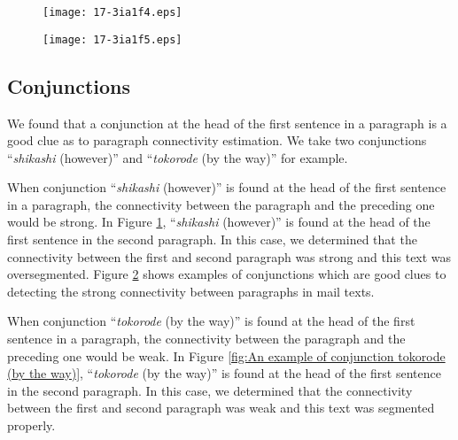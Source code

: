 \documentclass[english]{jnlp_1.4}
\begin{document}
\begin{figure}[p]
\begin{center}
\texttt{[image: 17-3ia1f4.eps]}
\end{center}
\label{fig:An example of conjunction shikashi (however)}
\end{figure}
\begin{figure}[p]
\begin{center}
\texttt{[image: 17-3ia1f5.eps]}
\end{center}
 \label{fig:examples of conjunctions at the head of the first sentence}
\end{figure}



\subsection{Conjunctions} 
\label{subsec:Conjunctions} 

We found that 
a conjunction at the head of the first sentence in a paragraph is 
a good clue as to paragraph connectivity estimation.
We take two conjunctions 
``\textit{shikashi} (however)'' and ``\textit{tokorode} (by the way)'' for example.

When conjunction ``\textit{shikashi} (however)'' is found 
at the head of the first sentence in a paragraph, 
the connectivity between the paragraph and the preceding one would be strong.
In Figure \ref{fig:An example of conjunction shikashi (however)}, 
``\textit{shikashi} (however)'' is found 
at the head of the first sentence in the second paragraph.
In this case, 
we determined that 
the connectivity between the first and second paragraph was strong and 
this text was oversegmented.
Figure \ref{fig:examples of conjunctions at the head of the first sentence} shows 
examples of conjunctions
which are good clues to detecting the strong connectivity 
between paragraphs in mail texts.

When conjunction ``\textit{tokorode} (by the way)'' is found 
at the head of the first sentence in a paragraph, 
the connectivity between the paragraph and the preceding one would be weak.
In Figure \ref{fig:An example of conjunction tokorode (by the way)}, 
``\textit{tokorode} (by the way)'' is found 
at the head of the first sentence in the second paragraph.
In this case, 
we determined that 
the connectivity between the first and second paragraph was weak and 
this text was segmented properly.
\end{document}
